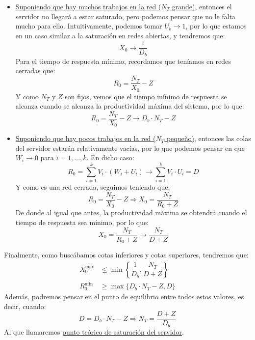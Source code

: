 \begin{itemize}
    \item \underline{Suponiendo que hay muchos trabajos en la red ($N_T$ grande)}, entonces el servidor no llegará a estar saturado, pero podemos pensar que no le falta mucho para ello. Intuitivamente, podemos tomar $U_b \to 1$, por lo que estamos en un caso similar a la saturación en redes abiertas, y tendremos que:
        \begin{equation*}
            X_0 \to \dfrac{1}{D_b}
        \end{equation*}
        Para el tiempo de respuesta mínimo, recordamos que teníamos en redes cerradas que:
        \begin{equation*}
            R_0 = \dfrac{N_T}{X_0} - Z
        \end{equation*}
        Y como $N_T$ y $Z$ son fijos, vemos que el tiempo mínimo de respuesta se alcanza cuando se alcanza la productividad máxima del sistema, por lo que:
        \begin{equation*}
            R_0 = \dfrac{N_T}{X_0}-Z \to D_b\cdot N_T- Z
        \end{equation*}
    \item \underline{Suponiendo que hay pocos trabajos en la red ($N_T$ pequeño)}, entonces las colas del servidor estarán relativamente vacías, por lo que podemos pensar en que $W_i \to 0$ para $i = 1,\ldots,k$. En dicho caso:
        \begin{equation*}
            R_0 = \sum_{i=1}^{k} V_i\cdot (W_i+U_i) \to \sum_{i=1}^{k}V_i \cdot U_i = D
        \end{equation*}
        Y como es una red cerrada, seguimos teniendo que:
        \begin{equation*}
            R_0 = \dfrac{N_T}{X_0} - Z \Longrightarrow X_0 = \dfrac{N_T}{R_0 + Z}
        \end{equation*}
        De donde al igual que antes, la productividad máxima se obtendrá cuando el tiempo de respuesta sea mínimo, por lo que:
        \begin{equation*}
            X_0 = \dfrac{N_T}{R_0 + Z} \to \dfrac{N_T}{D+Z}
        \end{equation*}
\end{itemize}

Finalmente, como buscábamos cotas inferiores y cotas superiores, tendremos que:
\begin{align*}
    X_0^\text{max} &\leq \min\left\{\dfrac{1}{D_b}, \dfrac{N_T}{D+Z}\right\} \\
    R_0^\text{min} &\geq \max\{D_b\cdot N_T-Z, D\}
\end{align*}
Además, podremos pensar en el punto de equilibrio entre todos estos valores, es decir, cuando:
\begin{equation*}
    D = D_b\cdot N_T - Z \Longrightarrow N_T = \dfrac{D+Z}{D_b}
\end{equation*}
Al que llamaremos \underline{punto teórico de saturación del servidor}.
